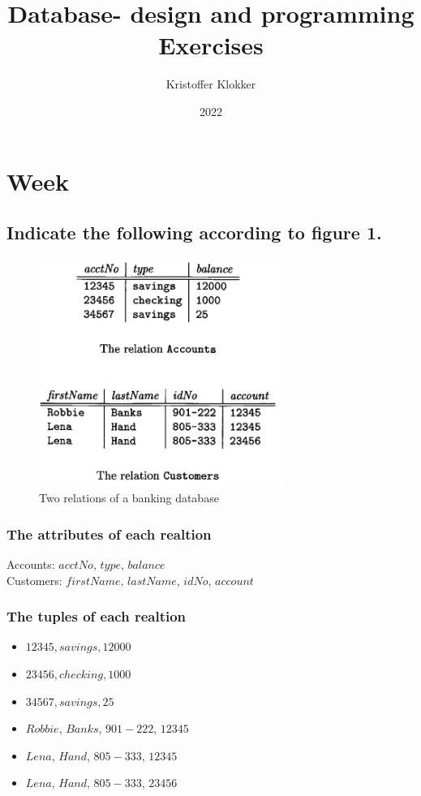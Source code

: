 \documentclass[12pt, a4paper]{article}
\title{Database- design and programming\\Exercises}
\date{2022}
\author{Kristoffer Klokker}
\begin{document}
	\maketitle
	\clearpage
	\tableofcontents
	\clearpage
		\setcounter{section}{5}
		\section{Week}
			\subsection{Indicate the following according to figure 1.}
				\begin{figure}[h!]
					\centering
					\includegraphics[width=300px]{assets/W6E1.png}
					\caption{Two relations of a banking database}
				\end{figure}
				\subsubsection{The attributes of each realtion}
					Accounts: $acctNo$, $type$, $balance$\\
					Customers: $firstName$, $lastName$, $idNo$, $account$
				\subsubsection{The tuples of each realtion}
					\begin{itemize}
						\item $12345, savings, 12000$
						\item $23456, checking, 1000$
						\item $34567, savings, 25$\\[5mm]
						\item $Robbie$, $Banks$, $901-222$, $12345$
						\item $Lena$, $Hand$, $805-333$, $12345$
						\item $Lena$, $Hand$, $805-333$, $23456$ 
					\end{itemize}
\end{document}
